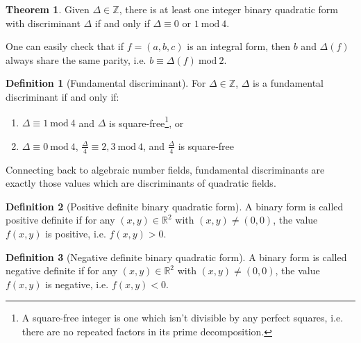 \documentclass{article}
\theoremstyle{definition}
\newtheorem{definition}{Definition}[section]
\theoremstyle{theorem}
\newtheorem{theorem}{Theorem}[section]
\theoremstyle{example}
\theoremstyle{corollary}
\begin{document}
\bigskip

\theoremstyle{theorem}
\begin{theorem}
Given \(\Delta \in \mathbb{Z}\), there is at least one integer binary quadratic form with discriminant \(\Delta\) if and only if \(\Delta \equiv 0\) or \(1 \ \textrm{mod} \ 4\).
\end{theorem}

\bigskip

One can easily check that if \(f = (a, b, c)\) is an integral form, then \(b\) and \(\Delta(f)\) always share the same parity, i.e. \(b \equiv \Delta(f) \ \textrm{mod} \ 2\).

\bigskip

\theoremstyle{definition}
\begin{definition}[Fundamental discriminant]
For \(\Delta \in \mathbb{Z}\), \(\Delta\) is a fundamental discriminant if and only if:
\begin{enumerate}
\item \(\Delta \equiv 1 \ \textrm{mod} \ 4\) and \(\Delta\) is square-free\footnote{A square-free integer is one which isn't divisible by any perfect squares, i.e. there are no repeated factors in its prime decomposition.}, or
\item \(\Delta \equiv 0 \ \textrm{mod} \ 4\), \(\frac{\Delta}{4} \equiv 2, 3 \ \textrm{mod} \ 4\), and \(\frac{\Delta}{4}\) is square-free
\end{enumerate}
\end{definition}

\bigskip

Connecting back to algebraic number fields, fundamental discriminants are exactly those values which are discriminants of quadratic fields.

\bigskip

\theoremstyle{definition}
\begin{definition}[Positive definite binary quadratic form]
A binary form is called positive definite if for any \((x, y) \in \mathbb{R}^{2}\) with \((x, y) \ne (0, 0)\), the value \(f(x, y)\) is positive, i.e. \(f(x, y) > 0\).
\end{definition}

\bigskip

\theoremstyle{definition}
\begin{definition}[Negative definite binary quadratic form]
A binary form is called negative definite if for any \((x, y) \in \mathbb{R}^{2}\) with \((x, y) \ne (0, 0)\), the value \(f(x, y)\) is negative, i.e. \(f(x, y) < 0\).
\end{definition}
\end{document}
